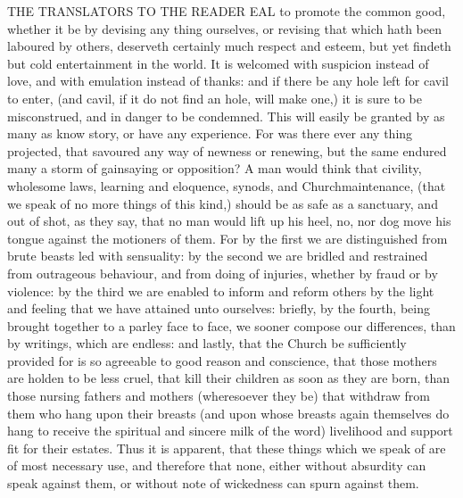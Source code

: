 THE TRANSLATORS TO THE READER
EAL to promote the common good, whether it be by devising any thing ourselves, or revising that which hath been laboured by others, deserveth certainly much respect and esteem, but yet findeth but cold entertainment in the world. It is welcomed with suspicion instead of love, and with emulation instead of thanks: and if there be any hole left for cavil to enter, (and cavil, if it do not find an hole, will make one,) it is sure to be misconstrued, and in danger to be condemned. This will easily be granted by as many as know story, or have any experience. For was there ever any thing projected, that savoured any way of newness or renewing, but the same endured many a storm of gainsaying or opposition? A man would think that civility, wholesome laws, learning and eloquence, synods, and Churchmaintenance, (that we speak of no more things of this kind,) should be as safe as a sanctuary, and out of shot, as they say, that no man would lift up his heel, no, nor dog move his tongue against the motioners of them. For by the first we are distinguished from brute beasts led with sensuality: by the second we are bridled and restrained from outrageous behaviour, and from doing of injuries, whether by fraud or by violence: by the third we are enabled to inform and reform others by the light and feeling that we have attained unto ourselves: briefly, by the fourth, being brought together to a parley face to face, we sooner compose our differences, than by writings, which are endless: and lastly, that the Church be sufficiently provided for is so agreeable to good reason and conscience, that those mothers are holden to be less cruel, that kill their children as soon as they are born, than those nursing fathers and mothers (wheresoever they be) that withdraw from them who hang upon their breasts (and upon whose breasts again themselves do hang to receive the spiritual and sincere milk of the word) livelihood and support fit for their estates. Thus it is apparent, that these things which we speak of are of most necessary use, and therefore that none, either without absurdity can speak against them, or without note of wickedness can spurn against them.

